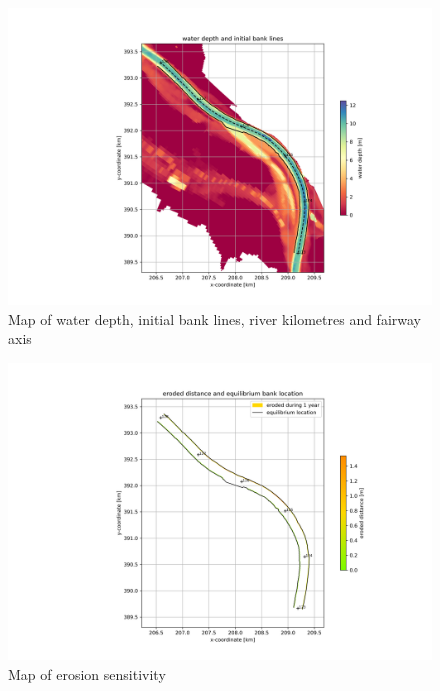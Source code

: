 \begin{figure}
\includegraphics[width=\textwidth]{figures/1_banklines.png}
\caption{Map of water depth, initial bank lines, river kilometres and fairway axis}
\label{Fig2.4}
\end{figure}

\begin{figure}
\includegraphics[width=\textwidth]{figures/2_erosion_sensitivity.png}
\caption{Map of erosion sensitivity}
\label{Fig2.5}
\end{figure}

